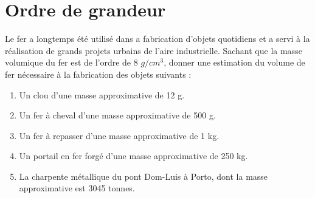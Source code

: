 \section{Ordre de grandeur}\label{ex:grandeur}

Le fer a longtemps été utilisé dans a fabrication d'objets quotidiens et a servi à la réalisation de grands projets urbains de l'aire industrielle. Sachant que la masse volumique du fer est de l'ordre de 8 $g/cm^3$, donner une estimation du volume de fer nécessaire à la fabrication des objets suivants :

\begin{enumerate}
	\item Un clou d'une masse approximative de 12 g.
	\item Un fer à cheval d'une masse approximative de 500 g.
	\item Un fer à repasser d'une masse approximative de 1 kg.
	\item Un portail en fer forgé d'une masse approximative de 250 kg.
	\item La charpente métallique du pont Dom-Luis à Porto, dont la masse approximative est \num{3045} tonnes.
\end{enumerate}